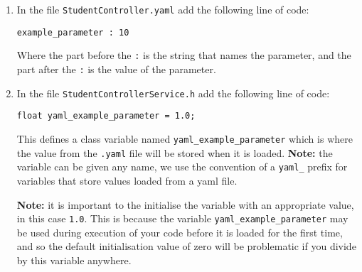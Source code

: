 \documentclass[]{report}
\newcommand{\headerfile}{StudentControllerService.h}
\newcommand{\yamlfile}{StudentController.yaml}
\begin{document}
	\begin{enumerate}[topsep=-1pt , itemsep=1pt ,  label = \textbf{(\arabic{*})} ]
		\item In the file \texttt{\yamlfile} add the following line of code:
		\begin{center}
			\large{\texttt{example\_parameter : 10}}
		\end{center}
		Where the part before the \texttt{:} is the string that names the parameter, and the part after the \texttt{:} is the value of the parameter.
		
		\item In the file \texttt{\headerfile} add the following line of code:
		\begin{center}
			\large{\texttt{float yaml\_example\_parameter = 1.0;}}
		\end{center}
		This defines a class variable named \texttt{yaml\_example\_parameter} which is where the value from the \texttt{.yaml} file will be stored when it is loaded. 
		\textbf{Note:} the variable can be given any name, we use the convention of a \texttt{yaml\_} prefix for variables that store values loaded from a yaml file.
		
		\textbf{Note:} it is important to the initialise the variable with an appropriate value, in this case \texttt{1.0}. This is because the variable \texttt{yaml\_example\_parameter} may be used during execution of your code before it is loaded for the first time, and so the default initialisation value of zero will be problematic if you divide by this variable anywhere.
		

\end{enumerate}
\end{document}
